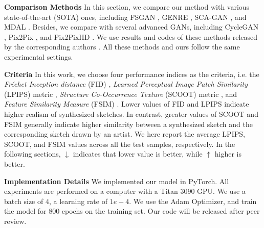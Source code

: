 \documentclass[10pt,twocolumn,letterpaper]{article}
\begin{document}

\textbf{Comparison Methods}
\label{ssec:exp_compmethod}
In this section, we compare our method with various state-of-the-art (SOTA) ones, including FSGAN \cite{Fan2021FS2K}, GENRE \cite{li2021genre}, SCA-GAN \cite{gao2020cagan}, and MDAL \cite{Zhang2019MAL}. Besides, we compare with several advanced GANs, including CycleGAN \cite{Zhu2017CycleGAN}, Pix2Pix \cite{Isola2017Pix2Pix}, and Pix2PixHD \cite{Wang2017Pix2PixHD}. We use results and codes of these methods released by the corresponding authors \cite{Fan2021FS2K}. All these methods and ours follow the same experimental settings. 

	


\textbf{Criteria}
\label{ssec:exp_criteria}
In this work, we choose four performance indices as the criteria, i.e. the \textit{Fr\'{e}chet Inception distance} (FID) \cite{Heusel2017FID}, \textit{Learned Perceptual Image Patch Similarity} (LPIPS) metric \cite{zhang2018lpips}, \textit{Structure Co-Occurrence Texture} (SCOOT) metric \cite{fan2019scoot}, and \textit{Feature Similarity Measure} (FSIM) \cite{Zhang2011FSIM}.  
Lower values of FID and LPIPS indicate higher realism of synthesized sketches. In contrast, greater values of SCOOT and FSIM generally indicate higher similarity between a synthesized sketch and the corresponding sketch drawn by an artist. We here report the average LPIPS, SCOOT, and FSIM values across all the test samples, respectively. In the following sections, $\downarrow$ indicates that lower value is better, while $\uparrow$ higher is better. 





\textbf{Implementation Details}
\label{ssec:implement}
We implemented our model in PyTorch. All experiments are performed on a computer with a Titan 3090 GPU. We use a batch size of 4, a learning rate of $1e-4$. We use the Adam Optimizer, and train the model for 800 epochs on the training set. Our code will be released after peer review. %


\end{document}
